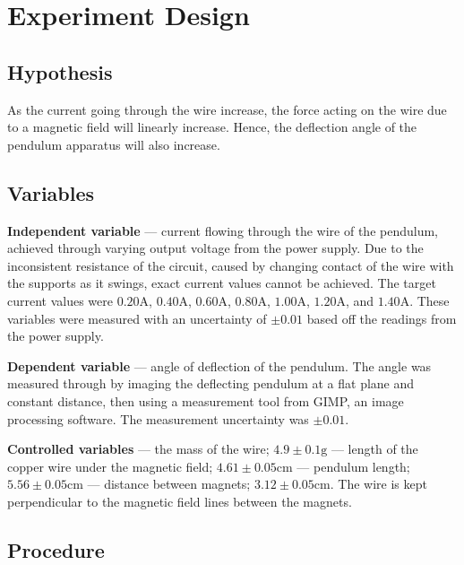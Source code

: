 \section*{Experiment Design}

\subsection*{Hypothesis}

As the current going through the wire increase, the force acting on the wire due to a magnetic field will linearly increase. Hence, the deflection angle of the pendulum apparatus will also increase.

\subsection*{Variables}

\textbf{Independent variable} --- current flowing through the wire of the pendulum, achieved through varying output voltage from the power supply.
Due to the inconsistent resistance of the circuit, caused by changing contact of the wire with the supports as it swings, exact current values cannot be achieved.
The target current values were $0.20\si{\ampere}$, $0.40\si{\ampere}$, $0.60\si{\ampere}$, $0.80\si{\ampere}$, $1.00\si{\ampere}$, $1.20\si{\ampere}$, and $1.40\si{\ampere}$.
These variables were measured with an uncertainty of $\pm0.01$ based off the readings from the power supply.

\textbf{Dependent variable} --- angle of deflection of the pendulum. The angle was measured through by imaging the deflecting pendulum at a flat plane and constant distance, then using a measurement tool from GIMP, an image processing software. The measurement uncertainty was $\pm0.01$.

\textbf{Controlled variables} --- the mass of the wire; $4.9\pm0.1\si{\gram}$ --- length of the copper wire under the magnetic field; $4.61\pm0.05\si{\centi\meter}$ --- pendulum length; $5.56\pm0.05\si{\centi\meter}$ --- distance between magnets; $3.12\pm0.05\si{\centi\meter}$.
The wire is kept perpendicular to the magnetic field lines between the magnets.

\subsection*{Procedure}

